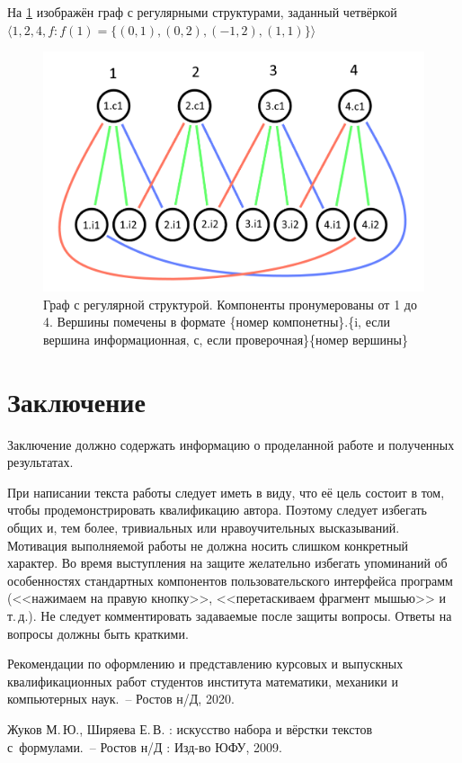 \documentclass[14pt]{mmcs_article}
\begin{document}
На \ref{stud:fig:1} изображён граф с регулярными структурами, заданный четвёркой $\langle 1, 2, 4, f: f(1) = \{ (0, 1), (0, 2), (-1, 2), (1, 1) \} \rangle$

\begin{figure}[H]
  \centering
  \includegraphics[scale=0.5]{Fig_1.png}
  \caption{ Граф с регулярной структурой. Компоненты пронумерованы от 1 до 4. Вершины помечены в формате \{номер компонетны\}.\{i, если вершина информационная, с, если проверочная\}\{номер вершины\} }\label{stud:fig:1}
\end{figure}
  

\newpage
{}
\section*{Заключение}

Заключение должно содержать информацию о проделанной работе и полученных результатах.

При написании текста работы следует иметь в виду, что её цель состоит в том, чтобы продемонстрировать квалификацию автора. Поэтому следует избегать общих и, тем более, тривиальных или нравоучительных высказываний. Мотивация выполняемой работы не должна носить слишком конкретный характер. Во время выступления на защите желательно избегать упоминаний об особенностях стандартных компонентов пользовательского интерфейса программ (<<нажимаем на правую кнопку>>, <<перетаскиваем фрагмент мышью>> и т.\,д.). Не следует комментировать задаваемые после защиты вопросы. Ответы на вопросы должны быть краткими.


\newpage

\renewcommand{\refname}{\centering \textbf{Литература}}

\begin{thebibliography}{0}
Рекомендации по оформлению
и представлению курсовых
и выпускных квалификационных работ
студентов института математики,
механики и компьютерных наук.~--
Ростов н/Д, 2020.

Жуков М.\,Ю., Ширяева Е.\,В.
\LaTeXe: искусство набора и вёрстки текстов с~формулами.~-- Ростов н/Д : Изд-во ЮФУ, 2009.
\end{thebibliography}
\end{document}

